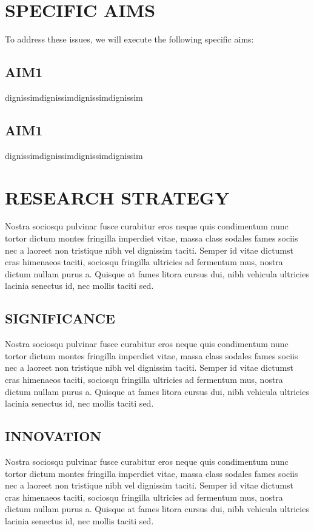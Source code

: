 \documentclass[11pt,twoside]{report}
\newcommand{\mytextbox}[2][6]{%
\begin{framed}
\noindent#2%
\end{framed}}
\begin{document}
\chapter*{SPECIFIC AIMS}
To address these issues, we will execute the following specific aims: 
\section*{AIM1} dignissimdignissimdignissimdignissim

\mytextbox[1]{\section*{AIM1} dignissimdignissimdignissimdignissim}

\chapter*{RESEARCH STRATEGY}
Nostra sociosqu pulvinar fusce curabitur eros neque quis condimentum nunc tortor dictum montes fringilla imperdiet vitae, massa class sodales fames sociis nec a laoreet non tristique nibh vel dignissim taciti. Semper id vitae dictumst cras himenaeos taciti, sociosqu fringilla ultricies ad fermentum mus, nostra dictum nullam purus a. Quisque at fames litora cursus dui, nibh vehicula ultricies lacinia senectus id, nec mollis taciti sed.

\section{SIGNIFICANCE}
Nostra sociosqu pulvinar fusce curabitur eros neque quis condimentum nunc tortor dictum montes fringilla imperdiet vitae, massa class sodales fames sociis nec a laoreet non tristique nibh vel dignissim taciti. Semper id vitae dictumst cras himenaeos taciti, sociosqu fringilla ultricies ad fermentum mus, nostra dictum nullam purus a. Quisque at fames litora cursus dui, nibh vehicula ultricies lacinia senectus id, nec mollis taciti sed.

\section{INNOVATION}
Nostra sociosqu pulvinar fusce curabitur eros neque quis condimentum nunc tortor dictum montes fringilla imperdiet vitae, massa class sodales fames sociis nec a laoreet non tristique nibh vel dignissim taciti. Semper id vitae dictumst cras himenaeos taciti, sociosqu fringilla ultricies ad fermentum mus, nostra dictum nullam purus a. Quisque at fames litora cursus dui, nibh vehicula ultricies lacinia senectus id, nec mollis taciti sed.
\end{document}
